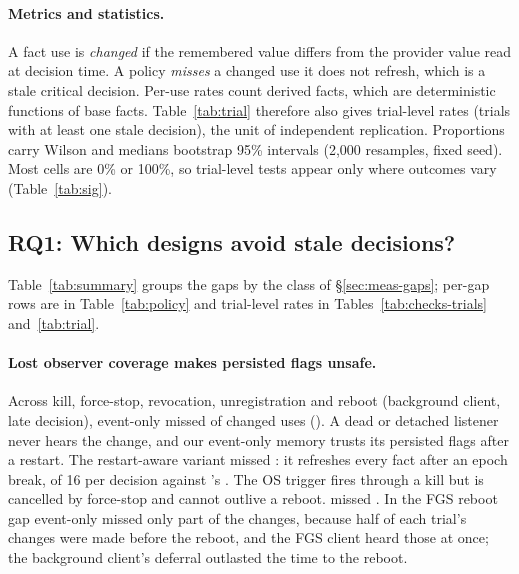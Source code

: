 \paragraph{Metrics and statistics.} A fact use is \emph{changed} if the remembered value differs from the provider value read at decision time. A policy \emph{misses} a changed use it does not refresh, which is a stale critical decision. Per-use rates count derived facts, which are deterministic functions of base facts. Table~\ref{tab:trial} therefore also gives trial-level rates (trials with at least one stale decision), the unit of independent replication. Proportions carry Wilson and medians bootstrap 95\% intervals (2{,}000 resamples, fixed seed). Most cells are 0\% or 100\%, so trial-level tests appear only where outcomes vary (Table~\ref{tab:sig}).

\subsection{RQ1: Which designs avoid stale decisions?}
\label{sec:eval-rq1}




Table~\ref{tab:summary} groups the gaps by the class of \S\ref{sec:meas-gaps}; per-gap rows are in Table~\ref{tab:policy} and trial-level rates in Tables~\ref{tab:checks-trials} and~\ref{tab:trial}.

\paragraph{Lost observer coverage makes persisted flags unsafe.} Across kill, force-stop, revocation, unregistration and reboot (background client, late decision), event-only missed \DeathEvK of \DeathChanged changed uses (\DeathEv). A dead or detached listener never hears the change, and our event-only memory trusts its persisted flags after a restart. The restart-aware variant missed \DeathEvrK: it refreshes every fact after an epoch break, \MeanEvrRefDeath of 16 per decision against \stamp's \MeanLmRefDeath. The OS trigger fires through a kill but is cancelled by force-stop and cannot outlive a reboot. \stamp missed \DeathLmK. In the FGS reboot gap event-only missed only part of the changes, because half of each trial's changes were made before the reboot, and the FGS client heard those at once; the background client's deferral outlasted the time to the reboot.

